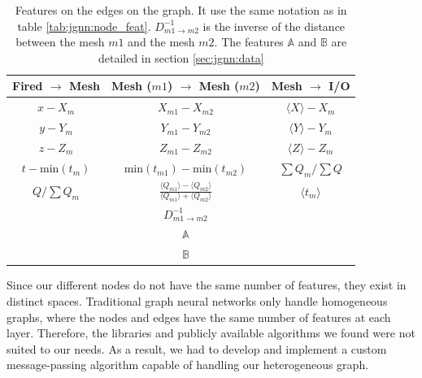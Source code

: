 \documentclass[../main.tex]{subfiles}
\begin{document}
\begin{table}
  \centering
  \begin{tabular}{|c|c|c|}
    \hline
    Fired $\rightarrow$ Mesh & Mesh ($m1$) $\rightarrow$ Mesh ($m2$) & Mesh $\rightarrow$ I/O \\
    \hline \hline
    $x - X_m$ & $X_{m1} - X_{m2}$ & $\langle X \rangle - X_m$ \\
    $y - Y_m$ & $Y_{m1} - Y_{m2}$ & $\langle Y \rangle - Y_m$ \\
    $z - Z_m$ & $Z_{m1} - Z_{m2}$ & $\langle Z \rangle - Z_m$ \\
    $t - \mathrm{min}(t_m)$ & $\mathrm{min}(t_{m1}) - \mathrm{min}(t_{m2})$ & $\sum Q_m / \sum Q$ \\
    $Q / \sum Q_m$ & $\frac{\langle Q_{m1} \rangle - \langle Q_{m2} \rangle}{\langle Q_{m1} \rangle + \langle Q_{m2} \rangle}$ & $\langle t_m \rangle$ \\
     & $D^{-1}_{m1 \rightarrow m2}$ & \\
     & $\mathbb{A}$ & \\
     & $\mathbb{B}$ & \\
    \hline
  \end{tabular}
  \caption{Features on the edges on the graph. It use the same notation as in table \ref{tab:jgnn:node_feat}. $D^{-1}_{m1 \rightarrow m2}$ is the inverse of the distance between the mesh $m1$ and the mesh $m2$. The features $\mathbb{A}$ and $\mathbb{B}$ are detailed in section \ref{sec:jgnn:data}}
  \label{tab:jgnn:edge_feat}

\end{table}

Since our different nodes do not have the same number of features, they exist in distinct spaces. Traditional graph neural networks only handle homogeneous graphs, where the nodes and edges have the same number of features at each layer. Therefore, the libraries and publicly available algorithms we found were not suited to our needs. As a result, we had to develop and implement a custom message-passing algorithm capable of handling our heterogeneous graph.
\end{document}
